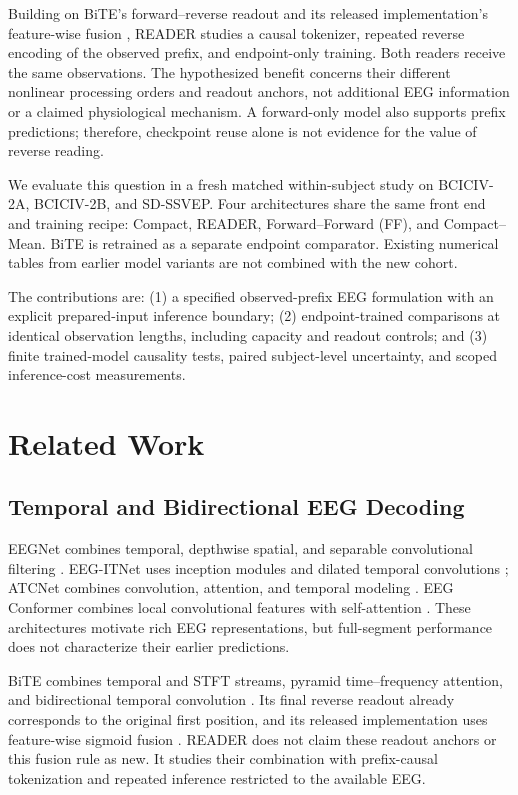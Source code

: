 \documentclass[conference]{IEEEtran}
\begin{document}
Building on BiTE's forward--reverse readout and its released implementation's
feature-wise fusion \cite{hong2025bidirectional,hong2025bitecode}, READER studies
a causal tokenizer, repeated reverse encoding of the observed prefix, and
endpoint-only training. Both readers receive the same observations. The
hypothesized benefit concerns their different nonlinear processing orders and
readout anchors, not additional EEG information or a claimed physiological
mechanism. A forward-only model also supports prefix predictions; therefore,
checkpoint reuse alone is not evidence for the value of reverse reading.

We evaluate this question in a fresh matched within-subject study on BCICIV-2A,
BCICIV-2B, and SD-SSVEP. Four architectures share the same front end and training
recipe: Compact, READER, Forward--Forward (FF), and Compact--Mean. BiTE is
retrained as a separate endpoint comparator. Existing numerical tables from
earlier model variants are not combined with the new cohort.

The contributions are: (1) a specified observed-prefix EEG formulation with an
explicit prepared-input inference boundary; (2) endpoint-trained comparisons at
identical observation lengths, including capacity and readout controls; and
(3) finite trained-model causality tests, paired subject-level uncertainty,
and scoped inference-cost measurements.

\section{Related Work}
\subsection{Temporal and Bidirectional EEG Decoding}
EEGNet combines temporal, depthwise spatial, and separable convolutional
filtering \cite{lawhern2018eegnet}. EEG-ITNet uses inception modules and dilated
temporal convolutions \cite{salami2022eeg}; ATCNet combines convolution,
attention, and temporal modeling \cite{altaheri2022physics}. EEG Conformer
combines local convolutional features with self-attention
\cite{song2022eeg}. These architectures motivate rich EEG representations,
but full-segment performance does not characterize their earlier predictions.

BiTE combines temporal and STFT streams, pyramid time--frequency attention,
and bidirectional temporal convolution \cite{hong2025bidirectional}. Its final
reverse readout already corresponds to the original first position, and its
released implementation uses feature-wise sigmoid fusion
\cite{hong2025bitecode}. READER does not claim these readout anchors or this
fusion rule as new. It studies their combination with prefix-causal tokenization
and repeated inference restricted to the available EEG.
\end{document}
